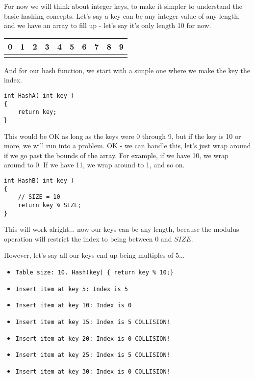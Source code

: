 \documentclass[a4paper,12pt,oneside]{book}
\begin{document}
For now we will think about integer keys, to make it simpler to understand
the basic hashing concepts. Let's say a key can be any integer value
of any length, and we have an array to fill up - let's say it's only
length 10 for now.

\begin{center}
    \begin{tabular}{| c | c | c | c | c | c | c | c | c | c |}
        \hline
        0 & 1 & 2 & 3 & 4 & 5 & 6 & 7 & 8 & 9
        \\ \hline
        & & & & & & & & &
        \\ \hline
    \end{tabular}
\end{center}

And for our hash function, we start with a simple one where we make the
key the index.

\begin{verbatim}
int HashA( int key )
{
    return key;
}
\end{verbatim}

This would be OK as long as the keys were 0 through 9, but if the
key is 10 or more, we will run into a problem. OK - we can handle this,
let's just wrap around if we go past the bounds of the array. For example,
if we have 10, we wrap around to 0. If we have 11, we wrap around to 1,
and so on.

\begin{verbatim}
int HashB( int key )
{
    // SIZE = 10
    return key % SIZE; 
}
\end{verbatim}

This will work alright... now our keys can be any length, because
the modulus operation will restrict the index to being between 0 and $SIZE$.

\newpage
However, let's say all our keys end up being multiples of 5...

\begin{itemize}
    \item \texttt{Table size: 10. Hash(key) \{ return key \% 10;\}}
    \item \texttt{Insert item at key 5: Index is 5}
    \item \texttt{Insert item at key 10: Index is 0}
    \item \texttt{Insert item at key 15: Index is 5 \tab COLLISION!}
    \item \texttt{Insert item at key 20: Index is 0 \tab COLLISION!}
    \item \texttt{Insert item at key 25: Index is 5 \tab COLLISION!}
    \item \texttt{Insert item at key 30: Index is 0 \tab COLLISION!}
\end{itemize}
\end{document}
